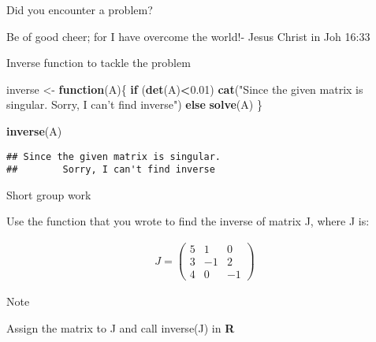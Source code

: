 \documentclass[ignorenonframetext,]{beamer}
\newenvironment{Shaded}{\begin{snugshade}}{\end{snugshade}}
\newcommand{\KeywordTok}[1]{\textcolor[rgb]{0.13,0.29,0.53}{\textbf{#1}}}
\newcommand{\FloatTok}[1]{\textcolor[rgb]{0.00,0.00,0.81}{#1}}
\newcommand{\StringTok}[1]{\textcolor[rgb]{0.31,0.60,0.02}{#1}}
\newcommand{\ControlFlowTok}[1]{\textcolor[rgb]{0.13,0.29,0.53}{\textbf{#1}}}
\newcommand{\OperatorTok}[1]{\textcolor[rgb]{0.81,0.36,0.00}{\textbf{#1}}}
\newcommand{\NormalTok}[1]{#1}
\begin{document}
\begin{frame}{Did you encounter a problem?}

Be of good cheer; for I have overcome the world!- Jesus Christ in Joh
16:33

\end{frame}

\begin{frame}[fragile]{Inverse function to tackle the problem}

\begin{Shaded}
\begin{Highlighting}[]
\NormalTok{inverse <-}\StringTok{ }\ControlFlowTok{function}\NormalTok{(A)\{}
  \ControlFlowTok{if}\NormalTok{ (}\KeywordTok{det}\NormalTok{(A)}\OperatorTok{<}\FloatTok{0.01}\NormalTok{)}
   \KeywordTok{cat}\NormalTok{(}\StringTok{"Since the given matrix is singular. }
\StringTok{       Sorry, I can't find inverse"}\NormalTok{)}
  \ControlFlowTok{else} 
    \KeywordTok{solve}\NormalTok{(A)}
\NormalTok{  \}}
\end{Highlighting}
\end{Shaded}

\begin{Shaded}
\begin{Highlighting}[]
\KeywordTok{inverse}\NormalTok{(A)}
\end{Highlighting}
\end{Shaded}

\begin{verbatim}
## Since the given matrix is singular. 
##        Sorry, I can't find inverse
\end{verbatim}

\end{frame}

\begin{frame}{Short group work}

Use the function that you wrote to find the inverse of matrix J, where J
is:

\begin{align*}
J=\begin{pmatrix}
5& 1&    0\\
3&   -1&    2\\
4&    0 &  -1
\end{pmatrix}\end{align*}

\begin{block}{Note}

Assign the matrix to J and call inverse(J) in \textbf{R}

\end{block}

\end{frame}
\end{document}
